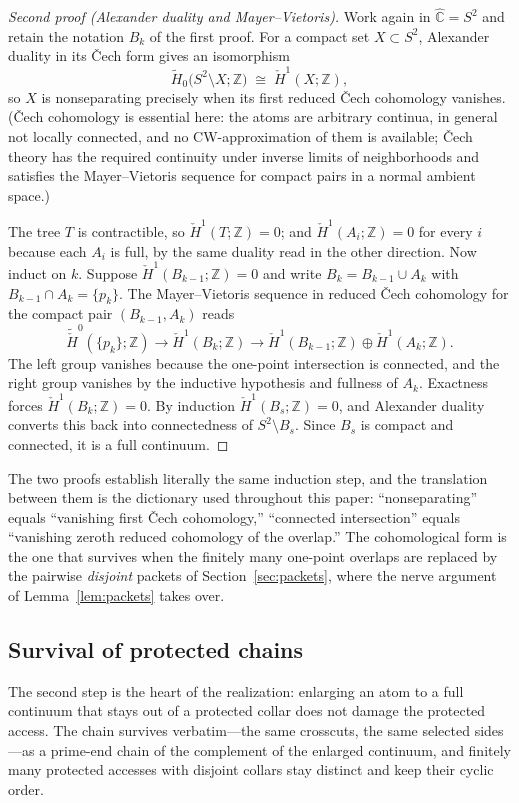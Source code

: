\documentclass[11pt,reqno]{amsart}
\theoremstyle{definition}
\theoremstyle{remark}
\newcommand{\Z}{\mathbb Z}
\newcommand{\Chat}{\widehat{\mathbb C}}
\begin{document}
\begin{proof}[Second proof (Alexander duality and Mayer--Vietoris)]
Work again in $\Chat=S^2$ and retain the notation $B_k$ of the first
proof.  For a compact set $X\subset S^2$, Alexander duality in its
\v{C}ech form \cite{Hat02} gives an isomorphism
\[
\widetilde H_0\bigl(S^2\setminus X;\Z\bigr)\;\cong\;\check H^1(X;\Z),
\]
so $X$ is nonseparating precisely when its first reduced \v{C}ech
cohomology vanishes.  (\v{C}ech cohomology is essential here: the atoms
are arbitrary continua, in general not locally connected, and no
CW-approximation of them is available; \v{C}ech theory has the required
continuity under inverse limits of neighborhoods and satisfies the
Mayer--Vietoris sequence for compact pairs in a normal ambient space.)

The tree $T$ is contractible, so $\check H^1(T;\Z)=0$; and
$\check H^1(A_i;\Z)=0$ for every $i$ because each $A_i$ is full, by the
same duality read in the other direction.  Now induct on $k$.  Suppose
$\check H^1(B_{k-1};\Z)=0$ and write $B_k=B_{k-1}\cup A_k$ with
$B_{k-1}\cap A_k=\{p_k\}$.  The Mayer--Vietoris sequence in reduced
\v{C}ech cohomology for the compact pair $(B_{k-1},A_k)$ reads
\[
\widetilde{\check H}^0(\{p_k\};\Z)
\longrightarrow
\check H^1(B_k;\Z)
\longrightarrow
\check H^1(B_{k-1};\Z)\oplus\check H^1(A_k;\Z).
\]
The left group vanishes because the one-point intersection is connected,
and the right group vanishes by the inductive hypothesis and fullness of
$A_k$.  Exactness forces $\check H^1(B_k;\Z)=0$.  By induction
$\check H^1(B_s;\Z)=0$, and Alexander duality converts this back into
connectedness of $S^2\setminus B_s$.  Since $B_s$ is compact and
connected, it is a full continuum.
\end{proof}

The two proofs establish literally the same induction step, and the
translation between them is the dictionary used throughout this paper:
``nonseparating'' equals ``vanishing first \v{C}ech cohomology,''
``connected intersection'' equals ``vanishing zeroth reduced cohomology of
the overlap.''  The cohomological form is the one that survives when the
finitely many one-point overlaps are replaced by the pairwise
\emph{disjoint} packets of Section~\ref{sec:packets}, where the nerve
argument of Lemma~\ref{lem:packets} takes over.

\subsection*{Survival of protected chains}
The second step is the heart of the realization: enlarging an atom to a
full continuum that stays out of a protected collar does not damage the
protected access.  The chain survives verbatim---the same crosscuts, the
same selected sides---as a prime-end chain of the complement of the
enlarged continuum, and finitely many protected accesses with disjoint
collars stay distinct and keep their cyclic order.
\end{document}
